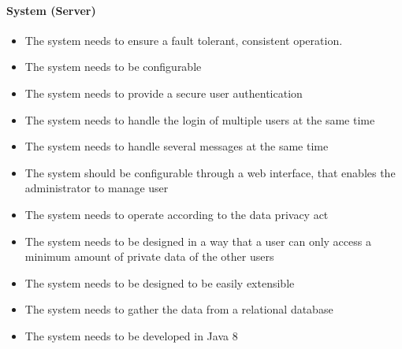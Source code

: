 \paragraph{System (Server)}
\begin{itemize}
\item The system needs to ensure a fault tolerant, consistent operation.
\item The system needs to be configurable
\item The system needs to provide a secure user authentication
\item The system needs to handle the login of multiple users at the same time
\item The system needs to handle several messages at the same time
\item The system should be configurable through a web interface, that enables the administrator to manage user
\item The system needs to operate according to the data privacy act
\item The system needs to be designed in a way that a user can only access a minimum amount of private data of the other users
\item The system needs to be designed to be easily extensible
\item The system needs to gather the data from a relational database
\item The system needs to be developed in Java 8
\end{itemize}

